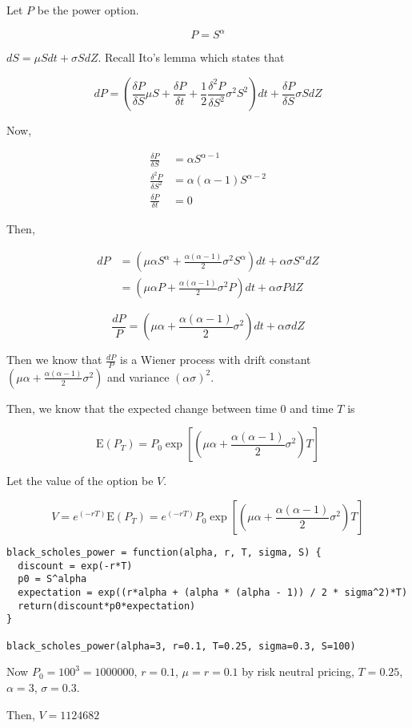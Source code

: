 \documentclass[11pt]{scrartcl}
\newcommand{\defrac}[2]{\ensuremath{\frac{\delta #1}{\delta #2}}}
\newcommand{\dedefrac}[2]{\ensuremath{\frac{\delta^2 #1}{\delta #2^2}}}
\newcommand{\epower}[1]{\ensuremath{e^{\left(#1\right)}}}
\newcommand{\expectation}[1]{\ensuremath{\mathrm{E}{\left(#1\right)}}}
\begin{document}
\subsection{}

Let $P$ be the power option.

\[P = S^\alpha\]

$dS = \mu S dt + \sigma S dZ$. Recall Ito's lemma which states that

\[dP = \left(\defrac{P}{S}\mu S + \defrac{P}{t} + \frac{1}{2}\dedefrac{P}{S} \sigma^2 S^2 \right)dt + \defrac{P}{S} \sigma S dZ\]

Now,

\begin{align*}
\defrac{P}{S} &= \alpha S^{\alpha - 1} \\
\dedefrac{P}{S} &= \alpha(\alpha - 1)S^{\alpha - 2} \\
\defrac{P}{t} &= 0
\end{align*}

Then,

\begin{align*}
dP &= \left(\mu\alpha S^\alpha + \frac{\alpha(\alpha - 1)}{2}\sigma^2 S^\alpha \right)dt + \alpha\sigma S^\alpha dZ \\
&= \left(\mu\alpha P + \frac{\alpha(\alpha - 1)}{2}\sigma^2 P \right)dt + \alpha\sigma P dZ
\end{align*}

\[\frac{dP}{P} = \left(\mu\alpha + \frac{\alpha(\alpha - 1)}{2}\sigma^2 \right)dt + \alpha\sigma dZ\]

Then we know that $\frac{dP}{P}$ is a Wiener process with drift constant $\left(\mu\alpha + \frac{\alpha(\alpha - 1)}{2}\sigma^2 \right)$ and variance $(\alpha\sigma)^2$.

Then, we know that the expected change between time $0$ and time $T$ is

\[\mathrm{E}(P_T) = P_0 \exp{\left[\left(\mu\alpha + \frac{\alpha(\alpha - 1)}{2}\sigma^2 \right)T\right]}\]

Let the value of the option be $V$.

\[V = \epower{-rT} \expectation{P_T} = \epower{-rT}P_0 \exp{\left[\left(\mu\alpha + \frac{\alpha(\alpha - 1)}{2}\sigma^2 \right)T\right]}\]

\begin{lstlisting}
black_scholes_power = function(alpha, r, T, sigma, S) {
  discount = exp(-r*T)
  p0 = S^alpha
  expectation = exp((r*alpha + (alpha * (alpha - 1)) / 2 * sigma^2)*T)
  return(discount*p0*expectation)
}

black_scholes_power(alpha=3, r=0.1, T=0.25, sigma=0.3, S=100)
\end{lstlisting}

Now $P_0 = 100^3 = 1000000$, $r = 0.1$, $\mu = r = 0.1$ by risk neutral pricing, $T = 0.25$, $\alpha = 3$, $\sigma = 0.3$.

Then, $V = 1124682$
\end{document}
